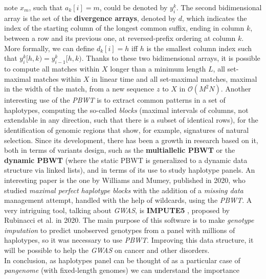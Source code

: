 \documentclass[a4paper,11pt, oneside]{article}
\begin{document}
note $x_m$, such that $a_k[i]=m$, could be denoted by $y_i^k$. The second
bidimensional array is the set of the \textbf{divergence arrays}, denoted by
$d$, which indicates the index of the starting column of the longest common
suffix, ending in column $k$, between a row and its previous one, at
reversed-prefix ordering at column $k$. More formally, we can define $d_k[i]=h$
iff $h$ is the smallest column index such that $y_i^k[h,k)=y_{i-1}^k[h,k)$. 
Thanks to these two bidimensional arrays, it is possible to compute all matches
within $X$ longer than a minimum length $L$, all set-maximal matches within $X$
in linear time and all set-maximal matches, maximal in the width of the match,
from a new sequence $z$ to $X$ in $\mathcal{O}(M^2N)$. Another interesting use
of the \textit{PBWT} is to extract common patterns in a set of
haplotypes, computing the so-called \textit{blocks} (maximal intervals of
columns, not extendable in any direction, such that there is a subset of
identical rows), for the identification of genomic regions that show, for
example, signatures of natural selection.
Since its development, there has been a growth in
research based on it, both in terms of variants design, such as the
\textbf{multiallelic PBWT} or the \textbf{dynamic PBWT} (where the static PBWT
is generalized to a dynamic data 
structure via linked lists), and in terms of its use to study haplotype panels.
An interesting paper is the one by Williams and Mumey, published in 2020,
who studied \textit{maximal perfect haplotype blocks} with the
addition of a \textit{missing data} management attempt, handled with the help of
wildcards, using the \textit{PBWT}. 
A very intriguing tool, talking about \textit{GWAS}, is
\textbf{IMPUTE5} \cite{impute5}, proposed by Rubinacci et al. in 2020. The main
purpose of this 
software is to make \textit{genotype imputation} to predict unobserved
genotypes from a panel with millions of haplotypes, so it was necessary to use
\textit{PBWT}. Improving this data structure, it will be possible to help the
\textit{GWAS} on cancer and other disorders.\\
In conclusion, as haplotypes panel can be thought of as a particular case of  
\textit{pangenome} (with fixed-length genomes) we can understand the importance
\end{document}
